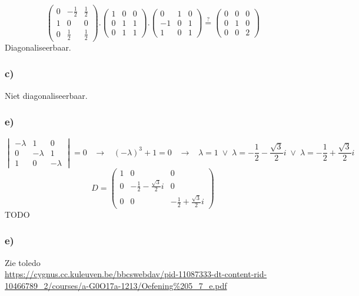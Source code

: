 \documentclass[11pt]{article}
\begin{document}
\[
\begin{pmatrix}
0 & -\frac{1}{2} & \frac{1}{2}\\
1 & 0 & 0\\
0 & \frac{1}{2} & \frac{1}{2}
\end{pmatrix}
.
\begin{pmatrix}
1 & 0 & 0\\
0 & 1 & 1\\
0 & 1 & 1
\end{pmatrix}
.
\begin{pmatrix}
0 & 1 & 0\\
-1 & 0 & 1\\
1 & 0 & 1
\end{pmatrix}
 \overset{?}{=} 
\begin{pmatrix}
0 & 0 & 0\\
0 & 1 & 0\\
0 & 0 & 2
\end{pmatrix}
\]
Diagonaliseerbaar.

\subsubsection*{c)}
Niet diagonaliseerbaar.

\subsubsection*{e)}
\[
\begin{vmatrix}
-\lambda & 1 & 0\\
0 & - \lambda & 1 \\
1 & 0 & -\lambda
\end{vmatrix}
=0
\;\;\;\longrightarrow\;\;\;
(-\lambda)^3 + 1 = 0
\;\;\;\longrightarrow\;\;\;
\lambda = 1 \;\vee\; \lambda = -\frac{1}{2}-\frac{\sqrt{3}}{2}i \;\vee\; \lambda = -\frac{1}{2}+\frac{\sqrt{3}}{2}i
\]
\[
D = 
\begin{pmatrix}
1 & 0 & 0\\
0 & -\frac{1}{2}-\frac{\sqrt{3}}{2}i & 0\\
0 & 0 & -\frac{1}{2}+\frac{\sqrt{3}}{2}i
\end{pmatrix}
\]
TODO

\subsubsection*{e)}
Zie toledo\\
\url{https://cygnus.cc.kuleuven.be/bbcswebdav/pid-11087333-dt-content-rid-10466789_2/courses/a-G0O17a-1213/Oefening%205_7_e.pdf}
\end{document}
